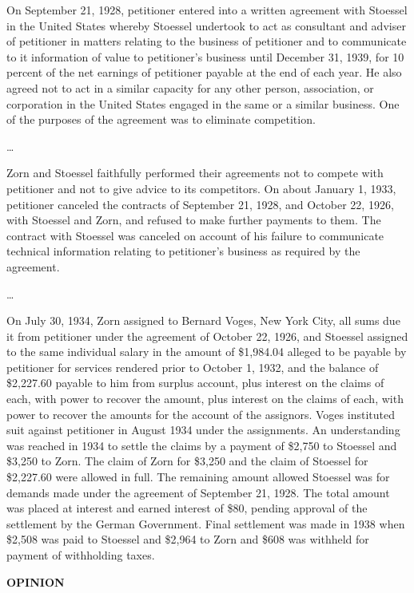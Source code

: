 \begin{select}
On September 21, 1928, petitioner entered into a written agreement with Stoessel in the United States whereby Stoessel undertook to act as consultant and adviser of petitioner in matters relating to the business of petitioner and to communicate to it information of value to petitioner's business until December 31, 1939, for 10 percent of the net earnings of petitioner payable at the end of each year. He also agreed not to act in a similar capacity for any other person, association, or corporation in the United States engaged in the same or a similar business. One of the purposes of the agreement was to eliminate competition.

\ldots

Zorn and Stoessel faithfully performed their agreements not to compete with petitioner and not to give advice to its competitors. On about January 1, 1933, petitioner canceled the contracts of September 21, 1928, and October 22, 1926, with Stoessel and Zorn, and refused to make further payments to them. The contract with Stoessel was canceled on account of his failure to communicate technical information relating to petitioner's business as required by the agreement.

\ldots

On July 30, 1934, Zorn assigned to Bernard Voges, New York City, all sums due it from petitioner under the agreement of October 22, 1926, and Stoessel assigned to the same individual salary in the amount of \$1,984.04 alleged to be payable by petitioner for services rendered prior to October 1, 1932, and the balance of \$2,227.60 payable to him from surplus account, plus interest on the claims of each, with power to recover the amount, plus interest on the claims of each, with power to recover the amounts for the account of the assignors. Voges instituted suit against petitioner in August 1934 under the assignments. An understanding was reached in 1934 to settle the claims by a payment of \$2,750 to Stoessel and \$3,250 to Zorn. The claim of Zorn for \$3,250 and the claim of Stoessel for \$2,227.60 were allowed in full. The remaining amount allowed Stoessel was for demands made under the agreement of September 21, 1928. The total amount was placed at interest and earned interest of \$80, pending approval of the settlement by the German Government. Final settlement was made in 1938 when \$2,508 was paid to Stoessel and \$2,964 to Zorn and \$608 was withheld for payment of withholding taxes.

\begin{center} \textbf{OPINION}
\end{center}


\end{select}
